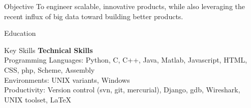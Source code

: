 \documentclass{resume}
\begin{document}
\maketitle
\thispagestyle{empty} %

\vspace{-0.5em}

\begin{component}{Objective}
To engineer scalable, innovative products, while also leveraging
the recent influx of big data toward building better products. \\
\end{component}

\vspace{-0.5em}

\begin{component}{Education}
    
\end{component}

\vspace{0.5em}

\begin{component}{Key Skills}
	\textbf{Technical Skills}\\
		Programming Languages: Python, C, C++, Java, Matlab, Javascript, HTML, CSS, php, Scheme, Assembly\\
		Environments: UNIX variants, Windows \\
		Productivity: Version control (svn, git, mercurial), Django, gdb, Wireshark, UNIX toolset, LaTeX
\end{component}

\vspace{0.5em}
\end{document}

